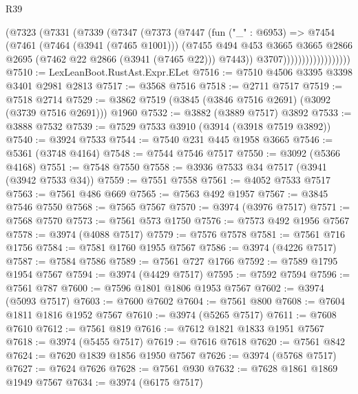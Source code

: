 \begin{lexlean}{R39}
\begin{coremodule}
                          (@7323
                            (@7331
                              (@7339
                                (@7347
                                  (@7373
                                    (@7447
                                      (fun ("_" : @6953) =>
                                      @7454
                                        (@7461
                                          (@7464 (@3941 (@7465 @1001)))
                                          (@7455
                                            @494
                                            @453
                                            @3665
                                            @3665
                                            @2866
                                            @2695
                                            (@7462 @22 @2866 (@3941 (@7465 @22)))
                                            @7443))
                                        @3707))))))))))))))))))
@7510 := LexLeanBoot.RustAst.Expr.ELet
@7516 := @7510 @4506 @3395 @3398 @3401 @2981 @2813
@7517 := @3568 @7516
@7518 := @2711 @7517
@7519 := @7518 @2714
@7529 := @3862 @7519 (@3845 (@3846 @7516 @2691) (@3092 (@3739 @7516 @2691))) @1960
@7532 := @3882 (@3889 @7517) @3892
@7533 := @3888 @7532
@7539 := @7529 @7533 @3910 (@3914 (@3918 @7519 @3892))
@7540 := @3924 @7533
@7544 := @7540 @231 @445 @1958 @3665
@7546 := @5361 (@3748 @4164)
@7548 := @7544 @7546 @7517
@7550 := @3092 (@5366 @4168)
@7551 := @7548 @7550
@7558 := @3936 @7533 @34 @7517 (@3941 (@3942 @7533 @34))
@7559 := @7551 @7558
@7561 := @4052 @7533 @7517
@7563 := @7561 @486 @669
@7565 := @7563 @492 @1957
@7567 := @3845 @7546 @7550
@7568 := @7565 @7567
@7570 := @3974 (@3976 @7517)
@7571 := @7568 @7570
@7573 := @7561 @573 @1750
@7576 := @7573 @492 @1956 @7567
@7578 := @3974 (@4088 @7517)
@7579 := @7576 @7578
@7581 := @7561 @716 @1756
@7584 := @7581 @1760 @1955 @7567
@7586 := @3974 (@4226 @7517)
@7587 := @7584 @7586
@7589 := @7561 @727 @1766
@7592 := @7589 @1795 @1954 @7567
@7594 := @3974 (@4429 @7517)
@7595 := @7592 @7594
@7596 := @7561 @787
@7600 := @7596 @1801 @1806 @1953 @7567
@7602 := @3974 (@5093 @7517)
@7603 := @7600 @7602
@7604 := @7561 @800
@7608 := @7604 @1811 @1816 @1952 @7567
@7610 := @3974 (@5265 @7517)
@7611 := @7608 @7610
@7612 := @7561 @819
@7616 := @7612 @1821 @1833 @1951 @7567
@7618 := @3974 (@5455 @7517)
@7619 := @7616 @7618
@7620 := @7561 @842
@7624 := @7620 @1839 @1856 @1950 @7567
@7626 := @3974 (@5768 @7517)
@7627 := @7624 @7626
@7628 := @7561 @930
@7632 := @7628 @1861 @1869 @1949 @7567
@7634 := @3974 (@6175 @7517)

\end{coremodule}
\end{lexlean}
